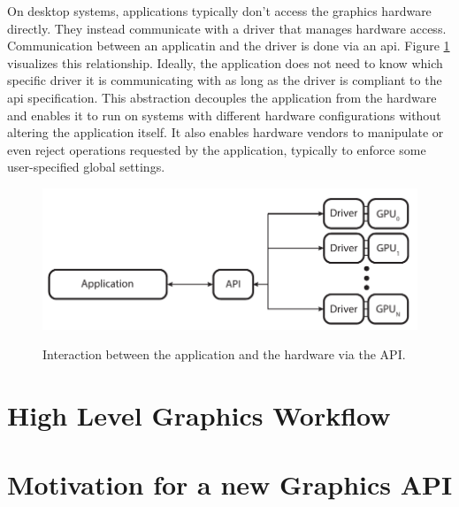   On desktop systems, applications typically don't access the graphics hardware directly. They instead communicate with a driver that manages hardware access. Communication between an applicatin and the driver is done via an \acrfull{api}. Figure \ref{fig:AppApiDriverOverview} visualizes this relationship. Ideally, the application does not need to know which specific driver it is communicating with as long as the driver is compliant to the \acrshort{api} specification. This abstraction decouples the application from the hardware and enables it to run on systems with different hardware configurations without altering the application itself. It also enables hardware vendors to manipulate or even reject operations requested by the application, typically to enforce some user-specified global settings. 

  \begin{figure}
    \caption{Interaction between the application and the hardware via the API.}
    \centering
    \includegraphics{Main/Images/Application_API_Driver_Overview}
    \label{fig:AppApiDriverOverview}
  \end{figure}



  \section{High Level Graphics Workflow}


  \section{Motivation for a new Graphics API}

